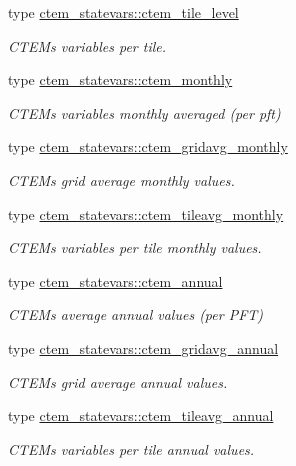 \begin{DoxyCompactItemize}
type \hyperlink{structctem__statevars_1_1ctem__tile__level}{ctem\+\_\+statevars\+::ctem\+\_\+tile\+\_\+level}
\begin{DoxyCompactList}\small\item\em C\+T\+E\+M\textquotesingle{}s variables per tile. \end{DoxyCompactList}\item 
type \hyperlink{structctem__statevars_1_1ctem__monthly}{ctem\+\_\+statevars\+::ctem\+\_\+monthly}
\begin{DoxyCompactList}\small\item\em C\+T\+E\+M\textquotesingle{}s variables monthly averaged (per pft) \end{DoxyCompactList}\item 
type \hyperlink{structctem__statevars_1_1ctem__gridavg__monthly}{ctem\+\_\+statevars\+::ctem\+\_\+gridavg\+\_\+monthly}
\begin{DoxyCompactList}\small\item\em C\+T\+E\+M\textquotesingle{}s grid average monthly values. \end{DoxyCompactList}\item 
type \hyperlink{structctem__statevars_1_1ctem__tileavg__monthly}{ctem\+\_\+statevars\+::ctem\+\_\+tileavg\+\_\+monthly}
\begin{DoxyCompactList}\small\item\em C\+T\+E\+M\textquotesingle{}s variables per tile monthly values. \end{DoxyCompactList}\item 
type \hyperlink{structctem__statevars_1_1ctem__annual}{ctem\+\_\+statevars\+::ctem\+\_\+annual}
\begin{DoxyCompactList}\small\item\em C\+T\+E\+M\textquotesingle{}s average annual values (per P\+F\+T) \end{DoxyCompactList}\item 
type \hyperlink{structctem__statevars_1_1ctem__gridavg__annual}{ctem\+\_\+statevars\+::ctem\+\_\+gridavg\+\_\+annual}
\begin{DoxyCompactList}\small\item\em C\+T\+E\+M\textquotesingle{}s grid average annual values. \end{DoxyCompactList}\item 
type \hyperlink{structctem__statevars_1_1ctem__tileavg__annual}{ctem\+\_\+statevars\+::ctem\+\_\+tileavg\+\_\+annual}
\begin{DoxyCompactList}\small\item\em C\+T\+E\+M\textquotesingle{}s variables per tile annual values. \end{DoxyCompactList}\end{DoxyCompactItemize}

